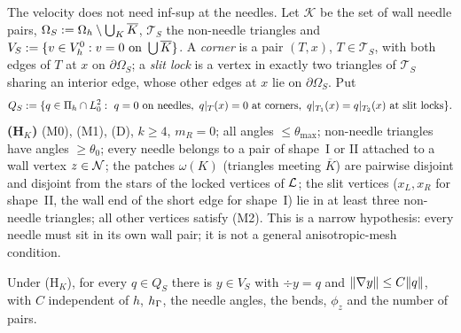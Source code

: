 The velocity does not need inf-sup at the needles. Let $\mathcal K$ be the set of wall needle pairs, $\Omega_S:=\Omega_h\setminus\bigcup_K\overline K$, $\mathcal T_S$ the non-needle triangles and $V_S:=\{v\in V_h^0:v=0\text{ on }\bigcup\overline K\}$. A \emph{corner} is a pair $(T,x)$, $T\in\mathcal T_S$, with both edges of $T$ at $x$ on $\partial\Omega_S$; a \emph{slit lock} is a vertex in exactly two triangles of $\mathcal T_S$ sharing an interior edge, whose other edges at $x$ lie on $\partial\Omega_S$. Put
\[
Q_S:=\{q\in\Pih\cap L^2_0:\ q=0\text{ on needles},\ q|_T(x)=0\text{ at corners},\ q|_{T_1}(x)=q|_{T_2}(x)\text{ at slit locks}\}.
\]
\textbf{(H$_K$)} (M0), (M1), (D), $k\ge4$, $m_R=0$; all angles $\le\theta_{\max}$; non-needle triangles have angles $\ge\theta_0$; every needle belongs to a pair of shape~I or II attached to a wall vertex $z\in\mathcal N$; the patches $\omega(K)$ (triangles meeting $\overline K$) are pairwise disjoint and disjoint from the stars of the locked vertices of $\mathcal L$; the slit vertices ($x_L,x_R$ for shape~II, the wall end of the short edge for shape~I) lie in at least three non-needle triangles; all other vertices satisfy (M2). This is a narrow hypothesis: every needle must sit in its own wall pair; it is not a general anisotropic-mesh condition.

\begin{theorem}\label{st:Sp}
Under (H$_K$), for every $q\in Q_S$ there is $y\in V_S$ with $\div y=q$ and $\lVert \nabla y\rVert\le C\lVert q\rVert$, with $C$ independent of $h$, $h_\Gamma$, the needle angles, the bends, $\phi_z$ and the number of pairs.
\end{theorem}

